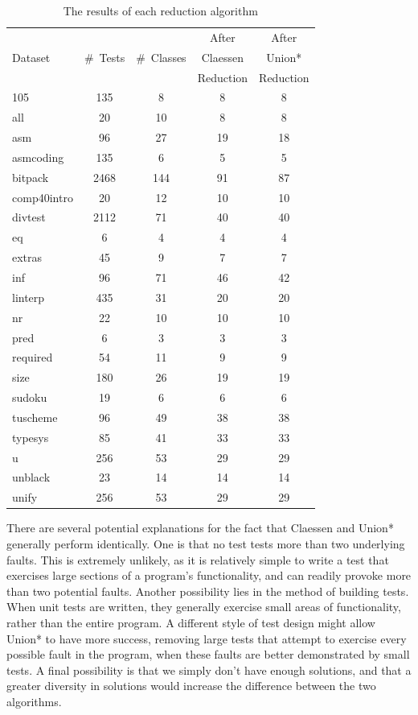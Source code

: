 \documentclass[11pt,twoside]{article}
\theoremstyle{definition}
\begin{document}
\begin{table}[t]
\def\?{\phantom0}
\centering

\begin{tabular}{ | l | c | c | c | c | }
\hline
        &          &             &   After   & After \\ 
Dataset & \#~Tests & \#\ Classes &  Claessen &  Union*  \\ 
     &            &             & Reduction & Reduction \\
\hline
105 & 135 & \?8 & \?8 & \?8 \\
all & \?20 & 10 & \?8 & \?8 \\
asm & \?96 & 27 & 19 & 18 \\
asmcoding & 135 & 6 & 5 & 5 \\
bitpack & 2468 & 144 & 91 & 87 \\
comp40intro & 20 & 12 & 10 & 10 \\
divtest & 2112 & 71 & 40 & 40 \\
eq & 6 & 4 & 4 & 4 \\
extras & 45 & 9 & 7 & 7 \\
inf & 96 & 71 & 46 & 42 \\
linterp & 435 & 31 & 20 & 20 \\
nr & 22 & 10 & 10 & 10 \\
pred & 6 & 3 & 3 & 3 \\
required & 54 & 11 & 9 & 9 \\
size & 180 & 26 & 19 & 19 \\
sudoku & 19 & 6 & 6 & 6 \\
tuscheme & 96 & 49 & 38 & 38 \\
typesys & 85 & 41 & 33 & 33 \\
u & 256 & 53 & 29 & 29 \\
unblack & 23 & 14 & 14 & 14 \\
unify & 256 & 53 & 29 & 29 \\
\hline
\end{tabular}
\caption{The results of each reduction algorithm}
\end{table}

There are several potential explanations for the fact that Claessen and Union* generally perform identically. One is that no test tests more than two underlying faults. This is extremely unlikely, as it is relatively simple to write a test that exercises large sections of a program's functionality, and can readily provoke more than two potential faults. Another possibility lies in the method of building tests. When unit tests are written, they generally exercise small areas of functionality, rather than the entire program. A different style of test design might allow Union* to have more success, removing large tests that attempt to exercise every possible fault in the program, when these faults are better demonstrated by small tests. A final possibility is that we simply don't have enough solutions, and that a greater diversity in solutions would increase the difference between the two algorithms.
\end{document}
